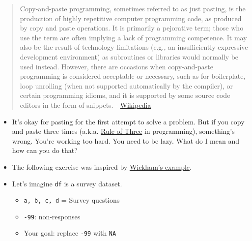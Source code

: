\documentclass[
]{book}
\begin{document}
\begin{quote}
Copy-and-paste programming, sometimes referred to as just pasting, is the production of highly repetitive computer programming code, as produced by copy and paste operations. It is primarily a pejorative term; those who use the term are often implying a lack of programming competence. It may also be the result of technology limitations (e.g., an insufficiently expressive development environment) as subroutines or libraries would normally be used instead. However, there are occasions when copy-and-paste programming is considered acceptable or necessary, such as for boilerplate, loop unrolling (when not supported automatically by the compiler), or certain programming idioms, and it is supported by some source code editors in the form of snippets. - \href{https://en.wikipedia.org/wiki/Copy-and-paste_programming}{Wikipedia}
\end{quote}

\begin{itemize}
\item
  It's okay for pasting for the first attempt to solve a problem. But if you copy and paste three times (a.k.a. \href{https://en.wikipedia.org/wiki/Rule_of_three_(computer_programming)}{Rule of Three} in programming), something's wrong. You're working too hard. You need to be lazy. What do I mean and how can you do that?
\item
  The following exercise was inspired by \href{http://adv-r.had.co.nz/Functional-programming.html}{Wickham's example}.
\item
  Let's imagine \texttt{df} is a survey dataset.

  \begin{itemize}
  \item
    \texttt{a,\ b,\ c,\ d} = Survey questions
  \item
    \texttt{-99}: non-responses
  \item
    Your goal: replace \texttt{-99} with \texttt{NA}
  \end{itemize}
\end{itemize}
\end{document}
